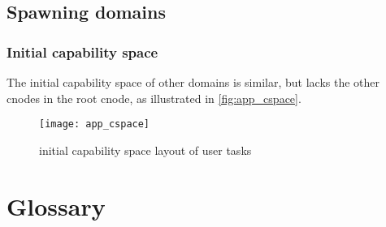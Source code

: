 \documentclass{scrreprt}
\begin{document}
  \section{Spawning domains}
  \subsection{Initial capability space}

  The initial capability space of other domains is similar, but lacks the other
  cnodes in the root cnode, as illustrated in \autoref{fig:app_cspace}.

  \begin{figure}
    \centering
    \texttt{[image: app\_cspace]}
    \caption{initial capability space layout of user tasks}
    \label{fig:app_cspace}
  \end{figure}


  \appendix
  \chapter{Glossary}
\end{document}
